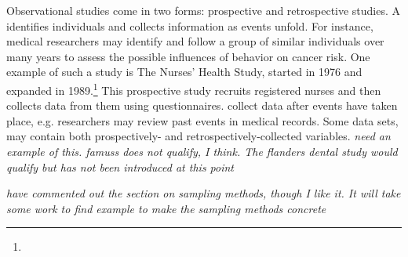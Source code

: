 \begin{doublespace}

Observational studies come in two forms: prospective and retrospective studies. A  identifies individuals and collects information as events unfold. For instance, medical researchers may identify and follow a group of similar individuals over many years to assess the possible influences of behavior on cancer risk. One example of such a study is The Nurses' Health Study, started in 1976 and expanded in 1989.\footnote{} This prospective study recruits registered nurses and then collects data from them using questionnaires.  collect data after events have taken place, e.g. researchers may review past events in medical records. Some data sets, may contain both prospectively- and retrospectively-collected variables. \textsl{need an example of this.  famuss does not qualify, I think.  The flanders dental study would qualify but has not been introduced at this point}

\textsl{have commented out the section on sampling methods, though I like it.  It will take some work to find example to make the sampling methods concrete}

\end{doublespace}
